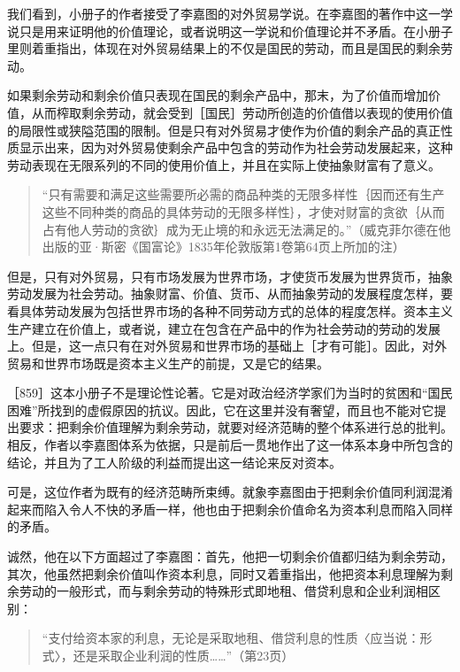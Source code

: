 我们看到，小册子的作者接受了李嘉图的对外贸易学说。在李嘉图的著作中这一学说只是用来证明他的价值理论，或者说明这一学说和价值理论并不矛盾。在小册子里则着重指出，体现在对外贸易结果上的不仅是国民的劳动，而且是国民的剩余劳动。

如果剩余劳动和剩余价值只表现在国民的剩余产品中，那末，为了价值而增加价值，从而榨取剩余劳动，就会受到［国民］劳动所创造的价值借以表现的使用价值的局限性或狭隘范围的限制。但是只有对外贸易才使作为价值的剩余产品的真正性质显示出来，因为对外贸易使剩余产品中包含的劳动作为社会劳动发展起来，这种劳动表现在无限系列的不同的使用价值上，并且在实际上使抽象财富有了意义。

\begin{quote}{“只有需要和满足这些需要所必需的商品种类的无限多样性｛因而还有生产这些不同种类的商品的具体劳动的无限多样性｝，才使对财富的贪欲｛从而占有他人劳动的贪欲｝成为无止境的和永远无法满足的。”（威克菲尔德在他出版的亚·斯密《国富论》1835年伦敦版第1卷第64页上所加的注）}\end{quote}

但是，只有对外贸易，只有市场发展为世界市场，才使货币发展为世界货币，抽象劳动发展为社会劳动。抽象财富、价值、货币、从而抽象劳动的发展程度怎样，要看具体劳动发展为包括世界市场的各种不同劳动方式的总体的程度怎样。资本主义生产建立在价值上，或者说，建立在包含在产品中的作为社会劳动的劳动的发展上。但是，这一点只有在对外贸易和世界市场的基础上［才有可能］。因此，对外贸易和世界市场既是资本主义生产的前提，又是它的结果。

［859］这本小册子不是理论性论著。它是对政治经济学家们为当时的贫困和“国民困难”所找到的虚假原因的抗议。因此，它在这里并没有奢望，而且也不能对它提出要求：把剩余价值理解为剩余劳动，就要对经济范畴的整个体系进行总的批判。相反，作者以李嘉图体系为依据，只是前后一贯地作出了这一体系本身中所包含的结论，并且为了工人阶级的利益而提出这一结论来反对资本。

可是，这位作者为既有的经济范畴所束缚。就象李嘉图由于把剩余价值同利润混淆起来而陷入令人不快的矛盾一样，他也由于把剩余价值命名为资本利息而陷入同样的矛盾。

诚然，他在以下方面超过了李嘉图：首先，他把一切剩余价值都归结为剩余劳动，其次，他虽然把剩余价值叫作资本利息，同时又着重指出，他把资本利息理解为剩余劳动的一般形式，而与剩余劳动的特殊形式即地租、借贷利息和企业利润相区别：

\begin{quote}{“支付给资本家的利息，无论是采取地租、借贷利息的性质〈应当说：形式〉，还是采取企业利润的性质……”（第23页）}\end{quote}

